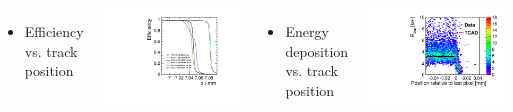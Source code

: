 \begin{frame}
\begin{columns}
    \centering

  \end{columns}

  \begin{columns}[t]
    
    \begin{itemize}
    \item Efficiency vs. track position
    \end{itemize}
    \centering
    \includegraphics[width=\textwidth, page=12]{../figures/TestBeam/edge_bcp.pdf}
    
    \begin{itemize}
    \item Energy deposition vs. track position
    \end{itemize}
    \centering
    \includegraphics[width=\textwidth]{../figures/ActiveEdge/55_GNDGR_Edep_TCAD_data.pdf}
  \end{columns}


\end{frame}

